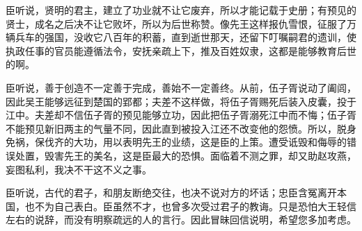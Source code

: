 \documentclass[12pt,UTF-8,openany]{ctexbook}
\begin{document}
\begin{normalsize}
    臣听说，贤明的君主，建立了功业就不让它废弃，所以才能记载于史册；有预见的贤士，成名之后决不让它败坏，所以为后世称赞。像先王这样报仇雪恨，征服了万辆兵车的强国，没收它八百年的积蓄，直到逝世那天，还留下叮嘱嗣君的遗训，使执政任事的官员能遵循法令，安抚亲疏上下，推及百姓奴隶，这都是能够教育后世的啊。
    
    臣听说，善于创造不一定善于完成，善始不一定善终。从前，伍子胥说动了阖闾，因此吴王能够远征到楚国的郢都；夫差不这样做，将伍子胥赐死后装入皮囊，投于江中。夫差却不信伍子胥的预见能够立功，因此把伍子胥溺死江中而不悔；伍子胥不能预见新旧两主的气量不同，因此直到被投入江还不改变他的怨愤。所以，脱身免祸，保伐齐的大功，用以表明先王的业绩，这是臣的上策。遭受诋毁和侮辱的错误处置，毁害先王的美名，这是臣最大的恐惧。面临着不测之罪，却又助赵攻燕，妄图私利，我决不干这不义之事。
    
    臣听说，古代的君子，和朋友断绝交往，也决不说对方的坏话；忠臣含冤离开本国，也不为自己表白。臣虽然不才，也曾多次受过君子的教诲。只是恐怕大王轻信左右的说辞，而没有明察疏远的人的言行。因此冒昧回信说明，希望您多加考虑。
    
\end{normalsize}
\end{document}
